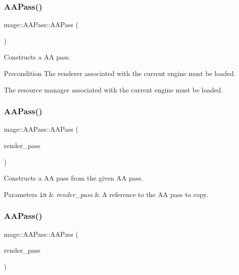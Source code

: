 \subsubsection{\texorpdfstring{A\+A\+Pass()}{AAPass()}\hspace{0.1cm}{\footnotesize\ttfamily [1/3]}}
{\footnotesize\ttfamily mage\+::\+A\+A\+Pass\+::\+A\+A\+Pass (\begin{DoxyParamCaption}{ }\end{DoxyParamCaption})}

Constructs a AA pass.

\begin{DoxyPrecond}{Precondition}
The renderer associated with the current engine must be loaded. 

The resource manager associated with the current engine must be loaded. 
\end{DoxyPrecond}
\hypertarget{classmage_1_1_a_a_pass_ad51f0e6fb81fe0f61f9e1eddb5571f98}{}\label{classmage_1_1_a_a_pass_ad51f0e6fb81fe0f61f9e1eddb5571f98} 
\subsubsection{\texorpdfstring{A\+A\+Pass()}{AAPass()}\hspace{0.1cm}{\footnotesize\ttfamily [2/3]}}
{\footnotesize\ttfamily mage\+::\+A\+A\+Pass\+::\+A\+A\+Pass (\begin{DoxyParamCaption}\item[{const \hyperlink{classmage_1_1_a_a_pass}{A\+A\+Pass} \&}]{render\+\_\+pass }\end{DoxyParamCaption})\hspace{0.3cm}{\ttfamily [delete]}}

Constructs a AA pass from the given AA pass.


\begin{DoxyParams}[1]{Parameters}
\mbox{\tt in}  & {\em render\+\_\+pass} & A reference to the AA pass to copy. \\
\hline
\end{DoxyParams}
\hypertarget{classmage_1_1_a_a_pass_a86da6ec985d907544991c9cd646982bd}{}\label{classmage_1_1_a_a_pass_a86da6ec985d907544991c9cd646982bd} 
\subsubsection{\texorpdfstring{A\+A\+Pass()}{AAPass()}\hspace{0.1cm}{\footnotesize\ttfamily [3/3]}}
{\footnotesize\ttfamily mage\+::\+A\+A\+Pass\+::\+A\+A\+Pass (\begin{DoxyParamCaption}\item[{\hyperlink{classmage_1_1_a_a_pass}{A\+A\+Pass} \&\&}]{render\+\_\+pass }\end{DoxyParamCaption})\hspace{0.3cm}{\ttfamily [default]}}


